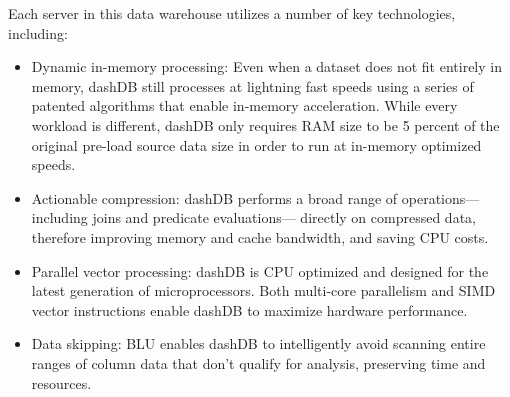 \documentclass[letterpaper, 12pt]{article}
\begin{document}
\begin{itemize}
	  \par\vspace{\baselineskip}
	  \cite{dashDB}
	  \par\vspace{\baselineskip}
	  Each server in this data warehouse utilizes a number of key technologies, including: 
	  \begin{itemize}
	    \item Dynamic in-memory processing: Even when a dataset
	    does not fit entirely in memory, dashDB still processes at
	    lightning fast speeds using a series of patented algorithms
	    that enable in-memory acceleration. While every workload
	    is different, dashDB only requires RAM size to be 5 percent
	    of the original pre-load source data size in order to run at
        in-memory optimized speeds.
        \item Actionable compression: dashDB performs a broad range
	    of operations—including joins and predicate evaluations—
	    directly on compressed data, therefore improving memory
	    and cache bandwidth, and saving CPU costs.
   	   \item Parallel vector processing: dashDB is CPU optimized
	   and designed for the latest generation of microprocessors.
	   Both multi-core parallelism and SIMD vector instructions
       enable dashDB to maximize hardware performance.
	   \item Data skipping: BLU enables dashDB to intelligently avoid
	   scanning entire ranges of column data that don’t qualify for
	   analysis, preserving time and resources.
	 \end{itemize}
	

\end{itemize}
\end{document}
